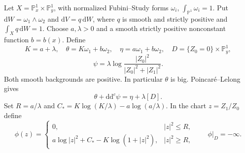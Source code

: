 \documentclass[11pt]{article}
\newcommand{\ddc}{\mathrm{d}\mathrm{d}^c}
\begin{document}
Let $X=\mathbb P^1_x\times\mathbb P^1_y$, with normalized Fubini--Study
forms $\omega_i$, $\int_{\mathbb P^1}\omega_i=1$. Put
$\mathrm{d}W=\omega_1\wedge\omega_2$ and $\mathrm{d}V=q\,\mathrm{d}W$,
where $q$ is smooth and strictly positive and $\int_Xq\,\mathrm{d}W=1$.
Choose $a,\lambda>0$ and a smooth strictly positive nonconstant function
$b=b(x)$. Define
\[
 K=a+\lambda,\quad \theta=K\omega_1+b\omega_2,
 \quad\eta=a\omega_1+b\omega_2,
 \quad D=\{Z_0=0\}\times\mathbb P^1_y,
\]
\[
 \psi=\lambda\log\frac{|Z_0|^2}{|Z_0|^2+|Z_1|^2}.
\]
Both smooth backgrounds are positive. In particular $\theta$ is big.
Poincar\'e--Lelong gives
\begin{equation}\label{eq:pole}
 \theta+\ddc\psi=\eta+\lambda[D].
\end{equation}
Set $R=a/\lambda$ and $C_*=K\log(K/\lambda)-a\log(a/\lambda)$.
In the chart $z=Z_1/Z_0$ define
\begin{equation}\label{eq:model}
 \phi(z)=\begin{cases}
 0,&|z|^2\le R,\\
 a\log|z|^2+C_*-K\log(1+|z|^2),&|z|^2\ge R,
 \end{cases}
 \qquad\phi|_D=-\infty.
\end{equation}
\end{document}
